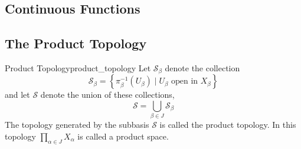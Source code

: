 


























\subsection{Continuous Functions}







\subsection{The Product Topology}


\begin{definition}{Product Topology}{product_topology}
    Let $\mathcal{S}_{\beta}$ denote the collection
    \[
    \mathcal{ S } _{\beta}=\left\{\pi_{\beta}^{-1}\left(U_{\beta}\right) \mid U_{\beta} \text { open in } X_{\beta}\right\}
    \]
    and let $\mathcal{ S } $ denote the union of these collections,
    \[
    \mathcal{S}=\bigcup_{\beta \in J} \mathcal{S}_{\beta}
    \]
    The topology generated by the subbasis $\mathcal{ S } $ is called the product topology. In this topology $\prod_{\alpha \in J} X_{\alpha}$ is called a product space.
\end{definition}


